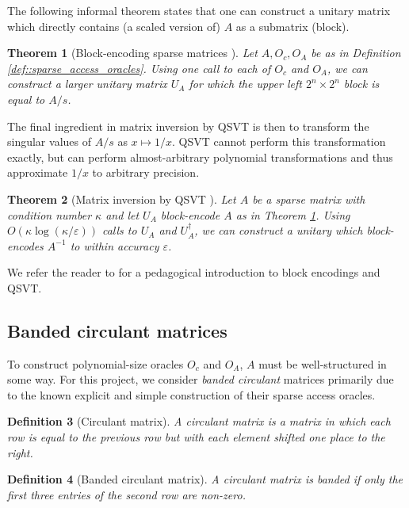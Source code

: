 \documentclass[10pt, twocolumn]{article}
\newtheorem{theorem}{Theorem}[section]
\newtheorem{definition}[theorem]{Definition}
\begin{document}
The following informal theorem states that one can construct a unitary matrix which directly contains (a scaled version of) $A$ as a submatrix (block).

\begin{theorem}[Block-encoding sparse matrices \cite{gilyen2019quantum, camps2203explicit}]
	\label{thm::block_encoding_sparse_matrices}
	Let $A, O_c, O_A$ be as in Definition \ref{def::sparse_access_oracles}. Using one call to each of $O_c$ and $O_A$, we can construct a larger unitary matrix $U_A$ for which the upper left $2^n \times 2^n$ block is equal to $A/s$.
\end{theorem}

The final ingredient in matrix inversion by QSVT is then to transform the singular values of $A/s$ as $x \mapsto 1/x$. QSVT cannot perform this transformation exactly, but can perform almost-arbitrary polynomial transformations \cite{sunderhauf2023generalized} and thus approximate $1/x$ to arbitrary precision.

\begin{theorem}[Matrix inversion by QSVT \cite{gilyen2019quantum}]
	\label{thm::matrix_inversion_by_qsvt}
	Let $A$ be a sparse matrix with condition number $\kappa$ and let $U_A$ block-encode $A$ as in Theorem \ref{thm::block_encoding_sparse_matrices}. Using $O(\kappa \log(\kappa / \varepsilon))$ calls to $U_A$ and $U_A^\dag$, we can construct a unitary which block-encodes $A^{-1}$ to within accuracy $\varepsilon$.
\end{theorem}

We refer the reader to \cite{martyn2021grand} for a pedagogical introduction to block encodings and QSVT.

\subsection{Banded circulant matrices}

To construct polynomial-size oracles $O_c$ and $O_A$, $A$ must be well-structured in some way. For this project, we consider \textit{banded circulant} matrices primarily due to the known explicit and simple construction of their sparse access oracles.

\begin{definition}[Circulant matrix]
	A circulant matrix is a matrix in which each row is equal to the previous row but with each element shifted one place to the right.
\end{definition}

\begin{definition}[Banded circulant matrix]
	A circulant matrix is banded if only the first three entries of the second row are non-zero.
\end{definition}
\end{document}
